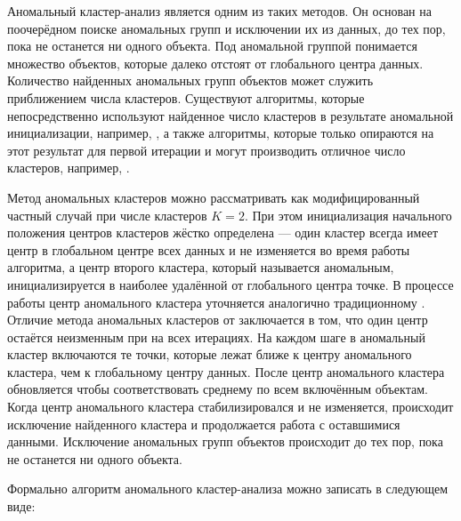 \documentclass[12pt]{diploma}
\begin{document}
	Аномальный кластер-анализ является одним из таких методов. Он основан на поочерёдном поиске аномальных групп и исключении их из данных, до тех пор, пока не останется ни одного объекта. Под аномальной группой понимается множество объектов, которые далеко отстоят от глобального центра данных.  Количество найденных аномальных групп объектов может служить приближением числа кластеров. Существуют алгоритмы, которые непосредственно используют найденное число кластеров в результате аномальной инициализации, например, \ikmeans \cite{anomalous-clustring}, а также алгоритмы, которые только опираются на этот результат для первой итерации и могут производить отличное число кластеров, например, \AWardpb.
	
	Метод аномальных кластеров можно рассматривать как модифицированный частный случай \kmeans при числе кластеров $ K=2 $. При этом инициализация начального положения центров кластеров жёстко определена --- один кластер всегда имеет центр в глобальном центре всех данных и не изменяется во время работы алгоритма, а центр второго кластера, который называется аномальным, инициализируется в наиболее удалённой от глобального центра точке. В процессе работы центр аномального кластера уточняется аналогично традиционному \kmeans. Отличие метода аномальных кластеров от \kmeans заключается в том, что один центр остаётся неизменным при на всех итерациях. На каждом шаге в аномальный кластер включаются те точки, которые лежат ближе к центру аномального кластера, чем к глобальному центру данных. После центр аномального кластера обновляется чтобы соответствовать среднему по всем включённым объектам. Когда центр аномального кластера стабилизировался и не изменяется, происходит исключение найденного кластера и продолжается работа с оставшимися данными. Исключение аномальных групп объектов происходит до тех пор, пока не останется ни одного объекта. 
	
	Формально алгоритм аномального кластер-анализа можно записать в следующем виде:
	
\end{document}
